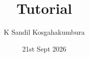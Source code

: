 \documentclass{report}
\title{Tutorial}
\author{K Sandil Kosgahakumbura}
\date{21st Sept 2026}
\begin{document}
\maketitle
\tableofcontents
\listoffigures
\listoftables
\listoflistings

\begin{abstract}
    \lipsum[1]
\end{abstract}







\end{document}
